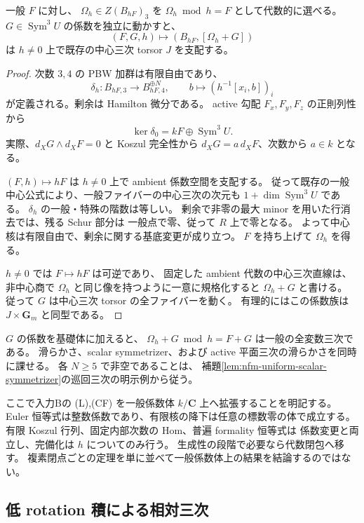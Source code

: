 \begin{lemma}[中心行列による支配的な $h$ 族]
\label{lem:nfm-dominant-central-family}
一般 $F$ に対し、
$\Omega_h\in Z(B_{hF})_3$ を $\Omega_h\bmod h=F$ として代数的に選べる。
$G\in\operatorname{Sym}^3U$ の係数を独立に動かすと、
\[
 (F,G,h)\longmapsto(B_{hF},[\Omega_h+G])
\]
は $h\ne0$ 上で既存の中心三次 torsor $J$ を支配する。
\end{lemma}
\begin{proof}
次数 $3,4$ の PBW 加群は有限自由であり、
\[
 \delta_h:B_{hF,3}\longrightarrow B_{hF,4}^{\oplus N},
 \qquad b\longmapsto(h^{-1}[x_i,b])_i
\]
が定義される。剰余は Hamilton 微分である。
active 勾配 $F_x,F_y,F_z$ の正則列性から
\[
 \ker\delta_0=kF\oplus\operatorname{Sym}^3U.
\]
実際、$d_XG\wedge d_XF=0$ と Koszul 完全性から
$d_XG=a\,d_XF$、次数から $a\in k$ となる。

$(F,h)\mapsto hF$ は $h\ne0$ 上で ambient 係数空間を支配する。
従って既存の一般中心公式により、一般ファイバーの中心三次の次元も
$1+\dim\operatorname{Sym}^3U$ である。
$\delta_h$ の一般・特殊の階数は等しい。
剰余で非零の最大 minor を用いた行消去では、残る Schur 部分は
一般点で零、従って $R$ 上で零となる。
よって中心核は有限自由で、剰余に関する基底変更が成り立つ。
$F$ を持ち上げて $\Omega_h$ を得る。

$h\ne0$ では $F\mapsto hF$ は可逆であり、
固定した ambient 代数の中心三次直線は、
非中心商で $\Omega_h$ と同じ像を持つように一意に規格化すると
$\Omega_h+G$ と書ける。
従って $G$ は中心三次 torsor の全ファイバーを動く。
有理的にはこの係数族は $J\times\mathbf G_m$ と同型である。

\end{proof}

$G$ の係数を基礎体に加えると、
$\Omega_h+G\bmod h=F+G$ は一般の全変数三次である。
滑らかさ、scalar symmetrizer、および active 平面三次の滑らかさを同時に課せる。
各 $N\ge5$ で非空であることは、
補題\ref{lem:nfm-uniform-scalar-symmetrizer}の巡回三次の明示例から従う。

ここで入力Bの (L),(CF) を一般係数体 $k/\mathbf C$ 上へ拡張することを明記する。
Euler 恒等式は整数係数であり、有限核の降下は任意の標数零の体で成立する。
有限 Koszul 行列、固定内部次数の Hom、普遍 formality 恒等式は
係数変更と両立し、完備化は $h$ についてのみ行う。
生成性の段階で必要なら代数閉包へ移す。
複素閉点ごとの定理を単に並べて一般係数体上の結果を結論するのではない。

\subsection{低 rotation 積による相対三次}

